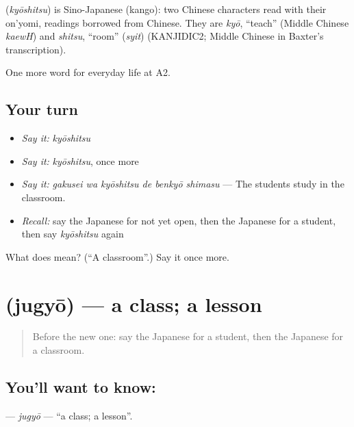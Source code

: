 \begin{cousinweb}
\textbf{} (\emph{kyōshitsu}) is Sino-Japanese (kango): two Chinese characters read with their on'yomi, readings borrowed from Chinese. They are \emph{kyō}, \textquotedblleft{}teach\textquotedblright{} (Middle Chinese \emph{kaewH}) and \emph{shitsu}, \textquotedblleft{}room\textquotedblright{} (\emph{syit}) (KANJIDIC2; Middle Chinese in Baxter's transcription).
\end{cousinweb}

\begin{grammarlens}[title={What you've built}]
One more word for everyday life at A2.
\end{grammarlens}

\subsection*{Your turn}
\begin{itemize}
\raggedright
  \item \emph{Say it:} \emph{kyōshitsu}
  \item \emph{Say it:} \emph{kyōshitsu}, once more
  \item \emph{Say it:} \emph{gakusei wa kyōshitsu de benkyō shimasu} — The students study in the classroom.
  \item \emph{Recall:} say the Japanese for not yet open, then the Japanese for a student, then say \emph{kyōshitsu} again
\end{itemize}

\begin{tcolorbox}[breakable,colback=teal!4,colframe=teal!35!black,title={Before you move on}]
What does  mean? (\textquotedblleft{}A classroom\textquotedblright{}.) Say it once more.
\end{tcolorbox}
\section[\texorpdfstring{\ja{じゅぎょう} (jugyō)}{じゅぎょう (jugyō)}]{ (jugyō) — a class; a lesson}

\label{lesson:JA-C224-jugyou}



\begin{quote}
Before the new one: say the Japanese for a student, then the Japanese for a classroom.
\end{quote}

\subsection*{You'll want to know: }
\textbf{} — \emph{jugyō} — \textquotedblleft{}a class; a lesson\textquotedblright{}.

